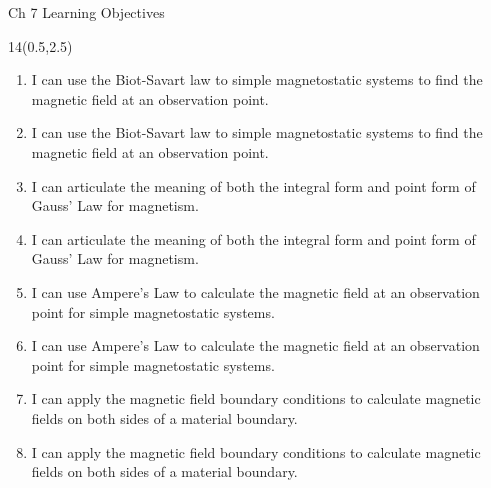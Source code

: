 \def\obja{ I can use the Biot-Savart law to simple magnetostatic systems to find the magnetic field at an observation point.}
\def\objb{  I can articulate the meaning of both the integral form and point form of Gauss' Law for magnetism.}
\def\objc{I can use Ampere's Law to calculate the magnetic field at an observation point for simple magnetostatic systems.}
\def\objd{  I can apply the magnetic field boundary conditions to calculate magnetic fields on both sides of a material boundary.  }
\begin{frame}{Ch 7 Learning Objectives}
	\begin{textblock}{14}(0.5,2.5)
	\begin{myblock}[0.95]{}
	\begin{small}
	\begin{enumerate}[{7}.1]
		\ifnum{}
			\item \alert{ \obja }
		\else 
			\item \obja
		\fi 
		\ifnum{}
			\item \alert{ \objb }
		\else 
			\item \objb
		\fi 
		\ifnum{}
			\item \alert{ \objc }
		\else 
			\item \objc
		\fi 
		\ifnum{}
			\item \alert{ \objd }
		\else 
			\item \objd
		\fi 	
	\end{enumerate}
	\end{small}
	\end{myblock}
	\end{textblock}
\end{frame}